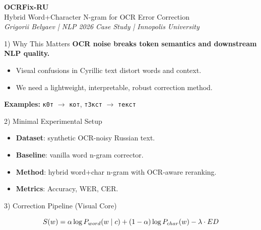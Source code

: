 \documentclass[9pt,a4paper,landscape]{article}
\begin{document}
\footnotesize
\begin{tcolorbox}[colback=white,colframe=accent,boxrule=1pt,arc=2mm,left=2mm,right=2mm,top=1mm,bottom=1mm]
\centering
{\LARGE \textbf{OCRFix-RU}}\\[1mm]
{\large Hybrid Word+Character N-gram for OCR Error Correction}\\
\textit{Grigorii Belyaev \;|\; NLP 2026 Case Study \;|\; Innopolis University}
\end{tcolorbox}

\vspace{1mm}
\begin{minipage}[t]{0.49\textwidth}
\begin{posterbox}{1) Why This Matters}
\textbf{OCR noise breaks token semantics and downstream NLP quality.}
\begin{itemize}
\item Visual confusions in Cyrillic text distort words and context.
\item We need a lightweight, interpretable, robust correction method.
\end{itemize}
\textbf{Examples:} \textcolor{bad}{\texttt{к0т}} $\rightarrow$ \textcolor{good}{\texttt{кот}},\;
\textcolor{bad}{\texttt{т3кст}} $\rightarrow$ \textcolor{good}{\texttt{текст}}
\end{posterbox}
\vspace{1mm}
\begin{posterbox}{2) Minimal Experimental Setup}
\begin{itemize}
\item \textbf{Dataset}: synthetic OCR-noisy Russian text.
\item \textbf{Baseline}: vanilla word n-gram corrector.
\item \textbf{Method}: hybrid word+char n-gram with OCR-aware reranking.
\item \textbf{Metrics}: Accuracy, WER, CER.
\end{itemize}
\end{posterbox}
\vspace{1mm}
\begin{posterbox}{3) Correction Pipeline (Visual Core)}
\centering
{}
\vspace{1mm}
\[
\Large S(w)=\alpha\log P_{word}(w\mid c)+(1-\alpha)\log P_{char}(w)-\lambda\cdot ED
\]
\end{posterbox}


\end{minipage}
\end{document}
